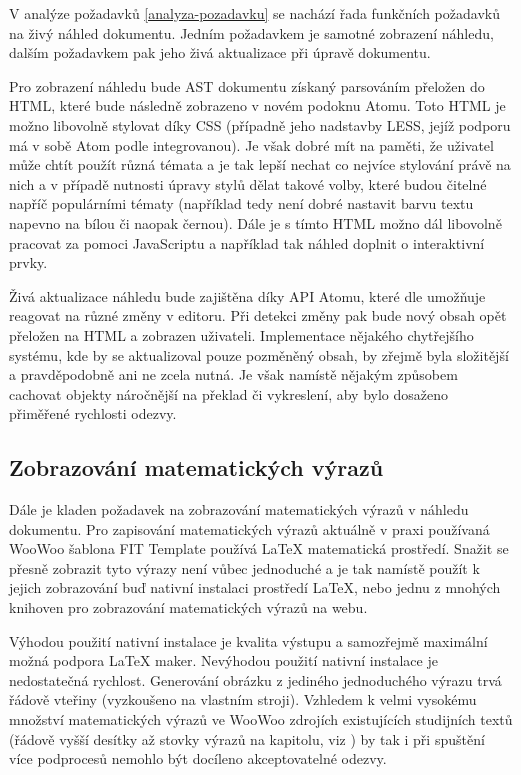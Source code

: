 V analýze požadavků \ref{analyza-pozadavku} se nachází řada funkčních požadavků na živý náhled dokumentu. Jedním
požadavkem je samotné zobrazení náhledu, dalším požadavkem pak jeho živá aktualizace při úpravě dokumentu.

Pro zobrazení náhledu bude AST dokumentu získaný parsováním přeložen do HTML, které bude následně zobrazeno v novém
podoknu Atomu. Toto HTML je možno libovolně stylovat díky CSS (případně jeho nadstavby LESS, jejíž podporu má v sobě
Atom podle \cite{atom-docs} integrovanou). Je však dobré mít na paměti, že uživatel může chtít použít různá témata a je
tak lepší nechat co nejvíce stylování právě na nich a v případě nutnosti úpravy stylů dělat takové volby, které budou
čitelné napříč populárními tématy (například tedy není dobré nastavit barvu textu napevno na bílou či naopak černou).
Dále je s tímto HTML možno dál libovolně pracovat za pomoci JavaScriptu a například tak náhled doplnit o interaktivní
prvky.

Živá aktualizace náhledu bude zajištěna díky API Atomu, které dle \cite{atom-docs} umožňuje reagovat na různé změny v
editoru. Při detekci změny pak bude nový obsah opět přeložen na HTML a zobrazen uživateli. Implementace nějakého
chytřejšího systému, kde by se aktualizoval pouze pozměněný obsah, by zřejmě byla složitější a pravděpodobně ani ne
zcela nutná. Je však namístě nějakým způsobem cachovat objekty náročnější na překlad či vykreslení, aby bylo dosaženo
přiměřené rychlosti odezvy.

\subsection{Zobrazování matematických výrazů}

Dále je kladen požadavek na zobrazování matematických výrazů v náhledu dokumentu. Pro zapisování matematických výrazů
aktuálně v praxi používaná WooWoo šablona FIT Template používá \LaTeX{} matematická prostředí. Snažit se přesně zobrazit
tyto výrazy není vůbec jednoduché a je tak namístě použít k jejich zobrazování buď nativní instalaci prostředí \LaTeX{},
nebo jednu z mnohých knihoven pro zobrazování matematických výrazů na webu.

Výhodou použití nativní instalace je kvalita výstupu a samozřejmě maximální možná podpora \LaTeX{} maker. Nevýhodou
použití nativní instalace je nedostatečná rychlost. Generování obrázku z jediného jednoduchého výrazu trvá řádově
vteřiny (vyzkoušeno na vlastním stroji). Vzhledem k velmi vysokému množství matematických výrazů ve WooWoo zdrojích
existujících studijních textů (řádově vyšší desítky až stovky výrazů na kapitolu, viz \cite{pkm}) by tak i při spuštění
více podprocesů nemohlo být docíleno akceptovatelné odezvy.

